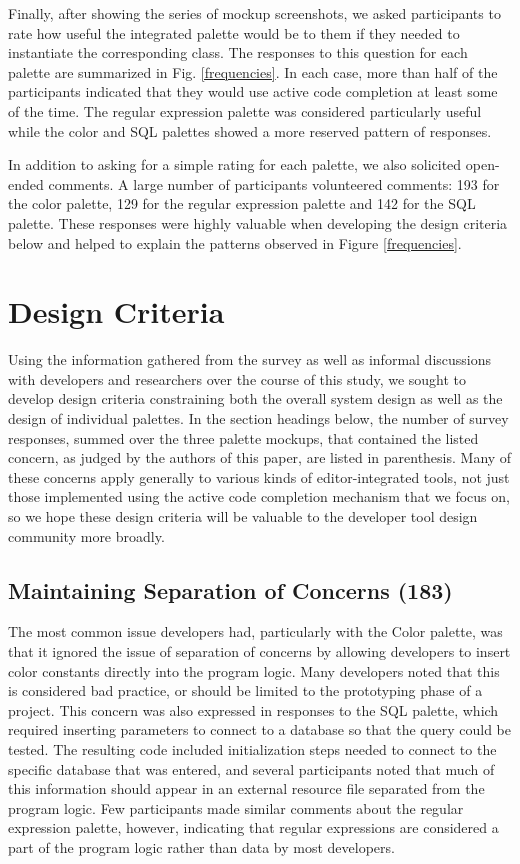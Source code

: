 \documentclass[10pt, conference, compsocconf]{IEEEtran}
\begin{document}
Finally, after showing the series of mockup screenshots, we asked participants to rate how useful the integrated palette would be to them if they needed to instantiate the corresponding class. The responses to this question for each palette are summarized in Fig. \ref{frequencies}. In each case, more than half of the participants indicated that they would use active code completion at least some of the time. The regular expression palette was considered particularly useful while the color and SQL palettes showed a more reserved pattern of responses. 

In addition to asking for a simple rating for each palette, we also solicited open-ended comments. A large number of participants volunteered comments: 193 for the color palette, 129 for the regular expression palette and 142 for the SQL palette. These responses were highly valuable when developing the design criteria below and helped to explain the patterns observed in Figure \ref{frequencies}.

\section{Design Criteria}
Using the information gathered from the survey as well as informal discussions with developers and researchers over the course of this study, we sought to develop design criteria constraining both the overall system design as well as the design of individual palettes. In the section headings below, the number of survey responses, summed over the three palette mockups, that contained the listed concern, as judged by the authors of this paper, are listed in parenthesis. Many of these concerns apply generally to various kinds of editor-integrated tools, not just those implemented using the active code completion mechanism that we focus on, so we hope these design criteria will be valuable to the developer tool design community more broadly.

\subsection{Maintaining Separation of Concerns (183)}
The most common issue developers had, particularly with the Color palette, was that it ignored the issue of separation of concerns by allowing developers to insert color constants directly into the program logic. Many developers noted that this is considered bad practice, or should be limited to the prototyping phase of a project. This concern was also expressed in responses to the SQL palette, which required inserting parameters to connect to a database so that the query could be tested. The resulting code included initialization steps needed to connect to the specific database that was entered, and several participants noted that much of this information should appear in an external resource file separated from the program logic. Few participants made similar comments about the regular expression palette, however, indicating that regular expressions are considered a part of the program logic rather than data by most developers.
\end{document}
